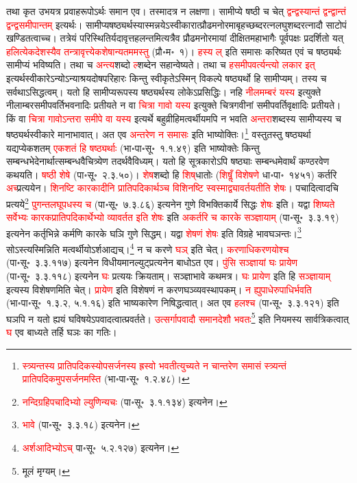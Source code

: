 \begin{sloppypar}
तथा कृत उभयत्र प्रवाह\-रूपोऽर्थः समान एव। तस्मादत्र न लक्षणा। सामीप्ये षष्ठी च चेत् \textcolor{red}{द्वन्द्वस्यान्तं द्वन्द्वान्तं द्वन्द्व\-समीपान्तम्} इत्यर्थः। सामीप्य\-षष्ठ्यर्थस्यास्मन्नयेऽस्वीकारात्प्रौढ\-मनोरमा\-बृहच्छब्दरत्न\-लघुशब्दरत्नादौ साटोपं खण्डितत्वाच्च। तत्रेयं परिस्थितिर्यदावृत्त\-हलन्तमित्यत्रैव प्रौढमनोरमायां दीक्षित\-महाभागैः पूर्वपक्षः प्रदर्शितो यत् \textcolor{red}{हलित्येकदेशस्यैव तन्त्रावृत्त्येकशेषान्यतममस्तु} (प्रौ॰म॰~१)। \textcolor{red}{हस्य ल्} इति समासः करिष्यत एवं च षष्ठ्यर्थः सामीप्यं भविष्यति। तथा च \textcolor{red}{अन्त्य}\-शब्दो \textcolor{red}{ल्}शब्देन सहान्वेष्यते। तथा च \textcolor{red}{ह\-समीप\-वर्त्यन्त्यो लकार इत्} इत्यर्थ\-स्वीकारेऽन्योऽन्याश्रय\-दोष\-परिहारः किन्तु स्वीकृतेऽस्मिन् विकल्पे षष्ठ्यर्थो हि सामीप्यम्। तस्य च सर्वथाऽसिद्धत्वम्। यतो हि सामीप्य\-रूपस्य षष्ठ्यर्थस्य लोकेऽप्रसिद्धिः। नहि \textcolor{red}{नीलमम्बरं यस्य} इत्युक्ते नीलाम्बर\-समीप\-वर्ति\-भवनादिः प्रतीयते न वा \textcolor{red}{चित्रा गावो यस्य} इत्युक्ते चित्रगवीनां समीप\-वर्ति\-वृक्षादिः प्रतीयते। किं वा \textcolor{red}{चित्रा गावोऽन्तरा समीपे वा यस्य} इत्यर्थे बहुव्रीहि\-मत्वर्थीयमपि न भवति \textcolor{red}{अन्तरा}\-शब्दस्य सामीप्यस्य च षष्ठ्यर्थ\-स्वीकारे मानाभावात्। अत एव \textcolor{red}{अन्तरेण न समासः} इति भाष्योक्तिः।\footnote{\textcolor{red}{स्त्र्यन्तस्य प्रातिपदिकस्यो\-पसर्जनस्य ह्रस्वो भवतीत्युच्यते न चान्तरेण समासं स्त्र्यन्तं प्रातिपदिकमुप\-सर्जनमस्ति} (भा॰पा॰सू॰~१.२.४८)।} वस्तुतस्तु षष्ठ्यर्था यद्यप्येकशतम् \textcolor{red}{एक\-शतं हि षष्ठ्यर्थाः} (भा॰पा॰सू॰~१.१.४९) इति भाष्योक्तेः किन्तु सम्बन्ध\-भेदेनार्थात्सम्बन्ध\-वैचित्र्येण तदर्थ\-वैविध्यम्। यतो हि सूत्र\-कारोऽपि षष्ठ्याः सम्बन्धमेवार्थं कण्ठ\-रवेण कथयति। \textcolor{red}{षष्ठी शेषे} (पा॰सू॰~२.३.५०)। \textcolor{red}{शेष}\-शब्दो हि \textcolor{red}{शिष्‌}\-धातोः (\textcolor{red}{शिषॢँ विशेषणे} धा॰पा॰~१४५१) कर्तरि \textcolor{red}{अच्}प्रत्ययेन। \textcolor{red}{शिनष्टि कारकादीनि प्रातिपदिकार्थञ्च विशिनष्टि स्वस्माद्व्यावर्तयतीति शेषः}। पचादित्वादचि प्रत्यये\footnote{\textcolor{red}{नन्दि\-ग्रहि\-पचादिभ्यो ल्युणिन्यचः} (पा॰सू॰~३.१.१३४) इत्यनेन।} \textcolor{red}{पुगन्त\-लघूपधस्य च} (पा॰सू॰~७.३.८६) इत्यनेन गुणे विभक्तिकार्ये सिद्धः \textcolor{red}{शेषः} इति।
यद्वा \textcolor{red}{शिष्यते सर्वेभ्यः कारक\-प्रातिपदिकार्थेभ्यो व्यावर्तत इति शेषः} इति \textcolor{red}{अकर्तरि च कारके सञ्ज्ञायाम्} (पा॰सू॰~३.३.१९) इत्यनेन कर्तृ\-भिन्ने कर्मणि कारके घञि गुणे सिद्धम्। यद्वा \textcolor{red}{शेषणं शेषः} इति विग्रहे भाव\-घञन्तः।\footnote{\textcolor{red}{भावे} (पा॰सू॰~३.३.१८) इत्यनेन।} सोऽस्त्यस्मिन्निति मत्वर्थीयोऽर्शआद्यच्।\footnote{\textcolor{red}{अर्शआदिभ्योऽच्} पा॰सू॰~५.२.१२७) इत्यनेन।} न च करणे \textcolor{red}{घञ्} इति चेत्। \textcolor{red}{करणाधिकरणयोश्च} (पा॰सू॰~३.३.११७) इत्यनेन विधीयमान\-ल्युट्\-प्रत्यनेन बाधोऽत एव। \textcolor{red}{पुंसि सञ्ज्ञायां घः प्रायेण} (पा॰सू॰~३.३.११८) इत्यनेन \textcolor{red}{घः} प्रत्ययः क्रियताम्। सञ्ज्ञा\-भावे कथमत्र। \textcolor{red}{घः प्रायेण} इति हि \textcolor{red}{सञ्ज्ञायाम्} इत्यस्य विशेषणमिति चेत्। \textcolor{red}{प्रायेण} इति विशेषणं न करण\-घञ्व्यवस्थापकम्। \textcolor{red}{न ह्युपाधेरुपाधिर्भवति} (भा॰पा॰सू॰~१.३.२, ५.१.१६) इति भाष्यकारेण निषिद्धत्वात्। अत एव \textcolor{red}{हलश्च} (पा॰सू॰~३.३.१२१) इति घञपि न यतो ह्ययं घविषयेऽपवादत्वात्प्रवर्तते। \textcolor{red}{उत्सर्गापवादौ समान\-देशौ भवतः}\footnote{मूलं मृग्यम्।} इति नियमस्य सार्वत्रिकत्वात् \textcolor{red}{घ} एव बाध्यते तर्हि घञः का गतिः।

\end{sloppypar}
